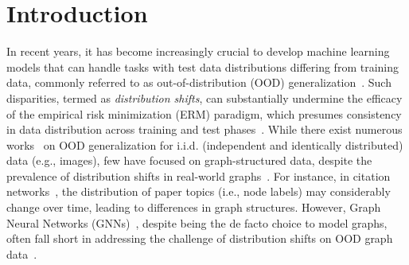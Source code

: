 \section{Introduction}

In recent years, it has become increasingly crucial to develop machine learning models that can handle tasks with test data distributions differing from training data, commonly referred to as out-of-distribution (OOD) generalization~\citep{mansour2009domain,blanchard2011generalizing,muandet2013domain,beery2018recognition,recht2019imagenet,su2019one}. Such disparities, termed as \textit{distribution shifts}, can substantially undermine the %
efficacy of the empirical risk minimization (ERM) paradigm, which presumes consistency in data distribution across training and test phases~\citep{quinonero2008dataset,lazer2014parable,zhang2018mixup}. While there exist numerous works~{\citep{hu2018does,krueger2021out,chang2020invariant,sagawa2020distributionally,koh2021wilds}} on OOD generalization for i.i.d. (independent and identically distributed) data (e.g., images), few have focused on graph-structured data, despite the prevalence of distribution shifts in real-world graphs~\citep{fakhraei2015collective, gui2022good,yu2023mind}. For instance, in citation networks~\citep{hu2020open}, the distribution of paper topics (i.e., node labels) may considerably change over time, leading to differences in graph structures. However, Graph Neural Networks (GNNs)~\citep{kipf2017semi,hamilton2017inductive, xu2018powerful, zhou2020graph, you2020design}, despite being the de facto choice to model graphs, often fall short in addressing the challenge of distribution shifts on OOD graph data~\citep{albadawy2018deep,dai2018dark,li2022out,tan2022graph,zhang2024survey}.


